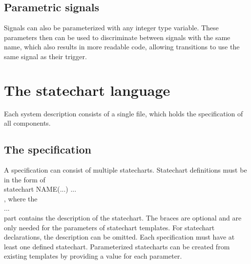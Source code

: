   \subsection{Parametric signals}
Signals can also be parameterized with any integer type variable. These parameters then can be used to discriminate between signals with the same name, which also results in more readable code, allowing transitions to use the same signal as their trigger.
\section{The statechart language}
Each system description consists of a single file, which holds the specification of all components.
  \subsection{The specification}
A specification can consist of multiple statecharts. Statechart definitions must be in the form of \\statechart NAME(...) { ... }\\, where the \\{ ... }\\ part contains the description of the statechart. The braces are optional and are only needed for the parameters of statechart templates. For statechart declarations, the description can be omitted. Each specification must have at least one defined statechart. Parameterized statecharts can be created from existing templates by providing a value for each parameter.
